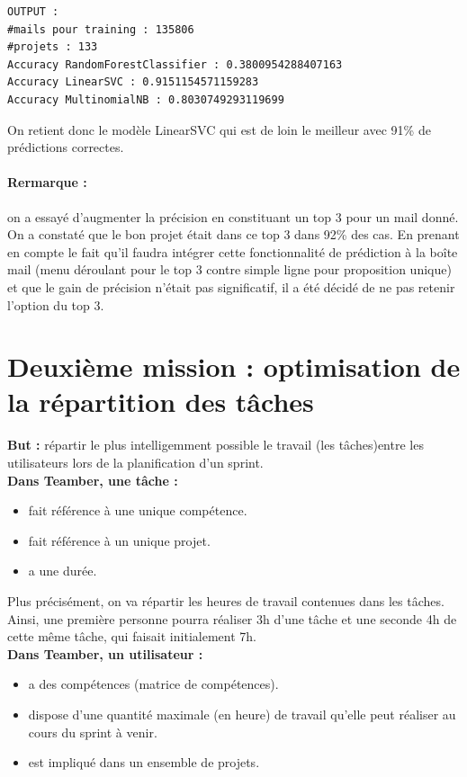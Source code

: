 \documentclass[12pt]{article}
\begin{document}
\begin{verbatim}
OUTPUT :
#mails pour training : 135806 
#projets : 133
Accuracy RandomForestClassifier : 0.3800954288407163
Accuracy LinearSVC : 0.9151154571159283
Accuracy MultinomialNB : 0.8030749293119699
\end{verbatim}

On retient donc le modèle LinearSVC qui est de loin le meilleur avec 91\% de prédictions correctes.

\paragraph{Rermarque :} on a essayé d'augmenter la précision en constituant un top 3 pour un mail donné. On a constaté que le bon projet était dans ce top 3 dans 92\% des cas. En prenant en compte le fait qu'il faudra intégrer cette fonctionnalité de prédiction à la boîte mail (menu déroulant pour le top 3 contre simple ligne pour proposition unique) et que le gain de précision n'était pas significatif, il a été décidé de ne pas retenir l'option du top 3.


\newpage
\section{Deuxième mission : optimisation de la répartition des tâches}
\textbf{But :} répartir le plus intelligemment possible le travail (les tâches)entre les utilisateurs lors de la planification d'un sprint.\\

\textbf{Dans Teamber, une tâche :}
\begin{itemize}
\item fait référence à une unique compétence.
\item fait référence à un unique projet.
\item a une durée.
\end{itemize}
Plus précisément, on va répartir les heures de travail contenues dans les tâches. Ainsi, une première personne pourra réaliser 3h d'une tâche et une seconde 4h de cette même tâche, qui faisait initialement 7h.\\


\textbf{Dans Teamber, un utilisateur :}
\begin{itemize}
\item a des compétences (matrice de compétences).
\item dispose d'une quantité maximale (en heure) de travail qu'elle peut réaliser au cours du sprint à venir.
\item est impliqué dans un ensemble de projets.
\end{itemize}
\end{document}
